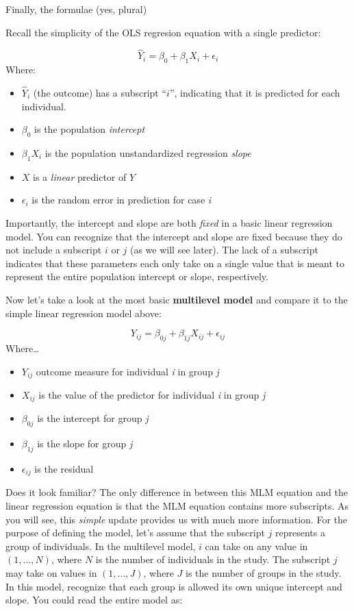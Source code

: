 \documentclass[
  11pt,
]{book}
\providecommand{\tightlist}{%
  \setlength{\itemsep}{0pt}\setlength{\parskip}{0pt}}
\begin{document}
Finally, the formulae (yes, plural)

Recall the simplicity of the OLS regresion equation with a single predictor:

\[\hat{Y}_{i} = \beta_{0} + \beta_{1}X_{i} + \epsilon_{i}\]
Where:

\begin{itemize}
\tightlist
\item
  \(\hat{Y}_{i}\) (the outcome) has a subscript ``\(i\)'', indicating that it is predicted for each individual.
\item
  \(\beta_{0}\) is the population \emph{intercept}
\item
  \(\beta_{1}X_{i}\) is the population unstandardized regression \emph{slope}
\item
  \(X\) is a \emph{linear} predictor of \(Y\)
\item
  \(\epsilon_{i}\) is the random error in prediction for case \emph{i}
\end{itemize}

Importantly, the intercept and slope are both \emph{fixed} in a basic linear regression model. You can recognize that the intercept and slope are fixed because they do not include a subscript \(i\) or \(j\) (as we will see later). The lack of a subscript indicates that these parameters each only take on a single value that is meant to represent the entire population intercept or slope, respectively.

Now let's take a look at the most basic \textbf{multilevel model} and compare it to the simple linear regression model above:

\[ Y_{ij} = \beta_{0j} + \beta_{1j}X_{ij} + \epsilon_{ij} \]
Where\ldots{}

\begin{itemize}
\tightlist
\item
  \(Y_{ij}\) outcome measure for individual \emph{i} in group \emph{j}
\item
  \(X_{ij}\) is the value of the predictor for individual \emph{i} in group \emph{j}
\item
  \(\beta_{0j}\) is the intercept for group \emph{j}
\item
  \(\beta_{1j}\) is the slope for group \emph{j}
\item
  \(\epsilon_{ij}\) is the residual
\end{itemize}

Does it look familiar? The only difference in between this MLM equation and the linear regression equation is that the MLM equation contains more subscripts. As you will see, this \emph{simple} update provides us with much more information. For the purpose of defining the model, let's assume that the subscript \(j\) represents a group of individuals. In the multilevel model, \(i\) can take on any value in \((1, ..., N)\), where \(N\) is the number of individuals in the study. The subscript \(j\) may take on values in \((1, ..., J)\), where \(J\) is the number of groups in the study. In this model, recognize that each group is allowed its own unique intercept and slope. You could read the entire model as:
\end{document}
